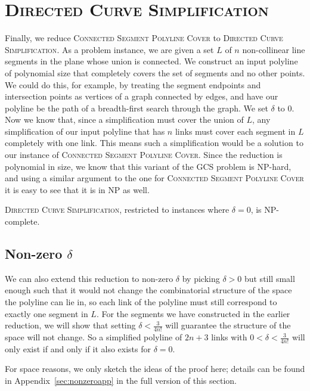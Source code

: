 \documentclass[]{llncs}
\newcommand{\curvesimp}{\textsc{Directed Curve Simplification}\xspace}
\newcommand{\consegcover}{\textsc{Connected Segment Polyline Cover}\xspace}
\begin{document}
\section {\curvesimp}

Finally, we reduce \consegcover to \curvesimp.
As a problem instance, we are given a set $L$ of $n$ non-collinear line segments in the plane whose union is connected. We construct an input polyline of polynomial size that completely covers the set of segments and no other points. We could do this, for example, by treating the segment endpoints and intersection points as vertices of a graph connected by edges, and have our polyline be the path of a breadth-first search through the graph. We set $\delta$ to $0$. 
Now we know that, since a simplification must cover the union of $L$, any simplification of our input polyline that has $n$ links must cover each segment in $L$ completely with one link. This means such a simplification would be a solution to our instance of \consegcover.
Since the reduction is polynomial in size, we know that this variant of the GCS problem is NP-hard, and using a similar argument to the one for \consegcover it is easy to see that it is in NP as well.
\begin{theorem}
\label{thm:finalcellhardsimplified}
  \curvesimp, restricted to instances where $\delta=0$, is NP-complete.
\end{theorem}

\subsection {Non-zero $\delta$}
\label{sec:nonzerodelta}
We can also extend this reduction to non-zero \(\delta\) by picking \(\delta > 0\) but still small enough such that it would not change the combinatorial structure of the space the polyline can lie in, so each link of the polyline must still correspond to exactly one segment in $L$.
For the segments we have constructed in the earlier reduction, we will show that setting \(\delta < \frac{3}{4n!}\) will guarantee the structure of the space will not change. So a simplified polyline of $2n+3$ links with \(0 < \delta < \frac{3}{4n!}\) will only exist if and only if it also exists for \(\delta = 0\).


For space reasons, we only sketch the ideas of the proof here; details can be found in Appendix~\ref{sec:nonzeroapp} in the full version of this section. 
\end{document}
